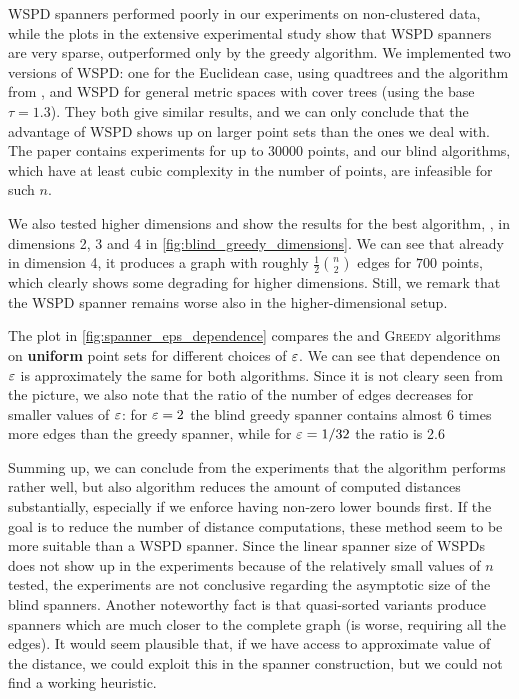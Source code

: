 \documentclass[a4paper,UKenglish,cleveref, autoref]{lipics-v2019}
\begin{document}
WSPD spanners performed poorly in our experiments
on non-clustered data, while the plots in the extensive experimental study \cite{farshi2009experimental}
show that WSPD spanners are very sparse, outperformed only by the greedy algorithm.
We implemented two versions of  WSPD: one for the Euclidean case,
using quadtrees and the algorithm from \cite{hp-book}, and WSPD for general metric
spaces with cover trees (using the base $\tau=1.3$). 
They both give similar results, and we can only conclude
that the advantage of WSPD shows up on larger point sets than the ones we deal with.
The paper \cite{farshi2009experimental} contains experiments for up to 30000 points,
and our blind algorithms, which have at least cubic complexity in the number of points,
are infeasible for such $n$.


We also tested higher dimensions and show the results for the best algorithm, \bgrdy,
in dimensions 2, 3 and 4 in \cref{fig:blind_greedy_dimensions}.
We can see that already in dimension 4, it produces a graph with roughly $\frac{1}{2}\binom{n}{2}$
edges for $700$ points, which clearly shows some degrading for higher dimensions. Still,
we remark that the WSPD spanner remains worse also in the higher-dimensional setup.

The plot in \cref{fig:spanner_eps_dependence}
compares the \bgrdy and \textsc{Greedy} algorithms
on \textbf{uniform} point sets for different choices of $\varepsilon$. We can see that dependence on $\varepsilon$
is approximately the same for both algorithms. Since it is not cleary seen from the picture, we also note 
that the ratio of the number of edges decreases for
smaller values of $\varepsilon$: 
for $\varepsilon = 2$ the blind greedy spanner contains almost 6 times more edges than the greedy spanner,
while for $\varepsilon = 1/32$ the ratio is 2.6

Summing up, we can conclude from the experiments that 
 the \bgrdy algorithm performs rather well, but also \brndm
algorithm reduces the amount of computed distances substantially, especially if we enforce having non-zero lower bounds
first. 
If the goal is to reduce the number of distance computations, these method seem to be more suitable than a WSPD spanner.
Since the linear spanner size of WSPDs does not show up in the experiments because of the relatively small values of $n$
tested, the experiments are not conclusive regarding the asymptotic size of the blind spanners.
Another noteworthy fact is that quasi-sorted variants produce spanners which are much closer to the complete graph
(\bqsgrdy is worse, requiring all the edges). It would seem plausible that, if we have
access to approximate value of the distance, we could exploit this in the spanner construction, but we could not
find a working heuristic.
\end{document}
